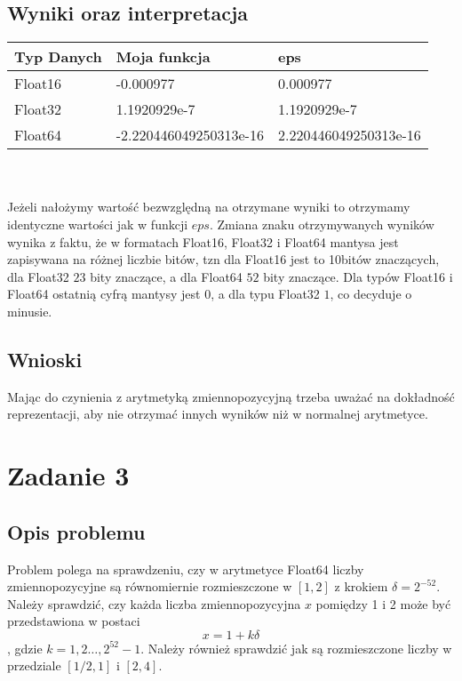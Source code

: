 \documentclass[11pt]{article}
\begin{document}
\subsection{Wyniki oraz interpretacja}
\setlength{\tabcolsep}{2pt}
\renewcommand{\arraystretch}{1.3}
\begin{tabularx}{\textwidth}{|l|X|X|}
\hline
Typ Danych & Moja funkcja & eps \\
\hline
Float16 & -0.000977 & 0.000977 \\
\hline
Float32 & 1.1920929e-7 & 1.1920929e-7 \\
\hline
Float64 & -2.220446049250313e-16 & 2.220446049250313e-16 \\
\hline
\end{tabularx} \\
\vspace{25pt} \\
Jeżeli nałożymy wartość bezwzględną na otrzymane wyniki to otrzymamy identyczne wartości jak w funkcji $eps$. Zmiana znaku otrzymywanych wyników wynika z faktu, że w formatach Float16, Float32 i Float64 mantysa jest zapisywana na różnej liczbie bitów, tzn dla Float16 jest to 10bitów znaczących, dla Float32 $23$ bity znaczące, a dla Float64 $52$ bity znaczące. Dla typów Float16 i Float64 ostatnią cyfrą mantysy jest $0$, a dla typu Float32 $1$, co decyduje o minusie.
\subsection{Wnioski}
Mając do czynienia z arytmetyką zmiennopozycyjną trzeba uważać na dokładność reprezentacji, aby nie otrzymać innych wyników niż w normalnej arytmetyce.

\section{Zadanie 3}
\subsection{Opis problemu}
Problem polega na sprawdzeniu, czy w arytmetyce Float64 liczby zmiennopozycyjne są równomiernie rozmieszczone w $[1,2]$ z krokiem $\delta=2^{-52}$. Należy sprawdzić, czy każda liczba zmiennopozycyjna $x$ pomiędzy 1 i 2 może być przedstawiona w postaci $$x=1+k\delta$$, 
gdzie $k=1,2\dots,2^{52}-1$. Należy również sprawdzić jak są rozmieszczone liczby w przedziale $[1/2,1]$ i $[2,4]$.
\end{document}
